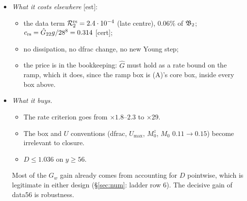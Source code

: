 \documentclass[11pt]{article}
\theoremstyle{remark}\newtheorem{remark}[theorem]{Remark}
\newcommand{\tC}{\textup{[cert]}}\newcommand{\tE}{\textup{[est]}}\newcommand{\tP}{\textup{[paper]}}\newcommand{\tR}{\textup{[rev]}}
\begin{document}
\begin{itemize}[leftmargin=*,itemsep=2pt]
\begin{center}
\begin{tabular}{@{}lccccccc@{}}
\end{tabular}\end{center}
The reconciled crude value $268125.9$ equals the reviewer's $268126$, and the widening ratio $\times1.2616$ confirms the reviewer's $\times1.26$. The reviewer's ``$G_w\approx1.03$'' is $D(56)$: $1.0356$ \tC.
\item \emph{What it costs elsewhere} \tE:
  \begin{itemize}[itemsep=0pt]
  \item the data term $\mathcal R^{\rm rs}_2=2.4\cdot10^{-4}$ (late centre), $0.06\%$ of $\mathfrak B_2$; $c_{\rm rs}=\hat G_{22}g/28^8=0.314$ \tC;
  \item no dissipation, no dfrac change, no new Young step;
  \item the price is in the bookkeeping: $\hat G$ must hold as a rate bound on the ramp, which it does, since the ramp box is (A)'s core box, inside every box above.
  \end{itemize}
\item \emph{What it buys.}
  \begin{itemize}[itemsep=0pt]
  \item The rate criterion goes from $\times1.8$--$2.3$ to $\times29$.
  \item The box and $U$ conventions (dfrac, $U_{\max}$, $M_0^z$, $M_0$ $0.11\to0.15$) become irrelevant to closure.
  \item $D\le1.036$ on $y\ge56$.
  \end{itemize}
  Most of the $G_w$ gain already comes from accounting for $D$ pointwise, which is legitimate in either design (§\ref{sec:num}: ladder row 6). The decisive gain of data56 is robustness.
\end{itemize}
\end{document}
